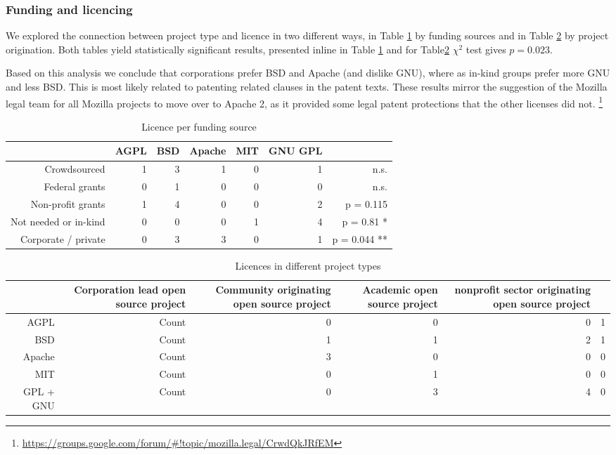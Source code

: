 \subsubsection{Funding and licencing}

We explored the connection between project type and licence in two different ways, in Table \ref{tab:licence_per_fudning} by funding sources and in Table \ref{tab:licence_per_project_type} by project origination. Both tables yield statistically significant results, presented inline in Table \ref{tab:licence_per_fudning} and for Table\ref{tab:licence_per_project_type} $\chi^2$ test gives $p=0.023$.

Based on this analysis we conclude that corporations prefer BSD and Apache (and dislike GNU), where as in-kind groups prefer more GNU and less BSD. This is most likely related to patenting related clauses in the patent texts. These results mirror the suggestion of the Mozilla legal team for all Mozilla projects to move over to Apache 2, as it provided some legal patent protections that the other licenses did not. \footnote{\url{https://groups.google.com/forum/#!topic/mozilla.legal/CrwdQkJRfEM}}

\begin{table}[htbp]
  \centering
  \caption{Licence per funding source}
    \begin{tabular}{rrrrrrr}
          & AGPL  & BSD   & Apache & MIT   & GNU GPL &  \\
\hline
    Crowdsourced & 1     & 3     & 1     & 0     & 1     & n.s. \\
    Federal grants & 0     & 1     & 0     & 0     & 0     & n.s. \\
    Non-profit grants & 1     & 4     & 0     & 0     & 2     & p = 0.115 \\
    Not needed or in-kind & 0     & 0     & 0     & 1     & 4     & p = 0.81 * \\
    Corporate / private & 0     & 3     & 3     & 0     & 1     & p = 0.044 ** \\
    \end{tabular}
  \label{tab:licence_per_fudning}
\end{table}

\begin{table}[htbp]
  \centering
  \caption{Licences in different project types}
    \begin{tabular}{rrrrrr}
          & Corporation lead open source project & Community originating open source project & Academic open source project & nonprofit sector originating open source project &  \\
    \hline
    AGPL  & Count & 0     & 0     & 0     & 1 \\
    BSD   & Count & 1     & 1     & 2     & 1 \\
    Apache & Count & 3     & 0     & 0     & 0 \\
    MIT   & Count & 0     & 1     & 0     & 0 \\
    GPL + GNU & Count & 0     & 3     & 4     & 0 \\
    \end{tabular}
  \label{tab:licence_per_project_type}
\end{table}%
